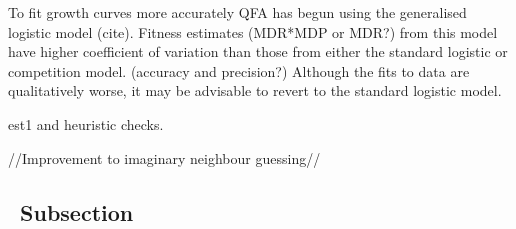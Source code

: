 To fit growth curves more accurately QFA has begun using the
generalised logistic model (cite). Fitness estimates (MDR*MDP or MDR?)
from this model have higher coefficient of variation than those from
either the standard logistic or competition model. (accuracy and
precision?) Although the fits to data are qualitatively worse, it may
be advisable to revert to the standard logistic model.


est1 and heuristic checks.


//Improvement to imaginary neighbour guessing//


\subsection{\thesubsection~Subsection}

